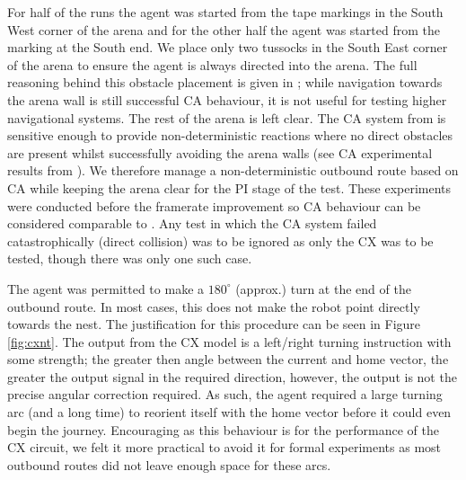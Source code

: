 \documentclass[a4paper,11pt,twoside,openright]{article}
\begin{document}
For half of the runs the agent was started from the tape markings in
the South West corner of the arena and for the other half the agent
was started from the marking at the South end.  We place only two
tussocks in the South East corner of the arena to ensure the agent is
always directed into the arena. The full reasoning behind this
obstacle placement is given in \cite{Mitchell2018}; while navigation
towards the arena wall is still successful CA behaviour, it is not
useful for testing higher navigational systems. The rest of the arena
is left clear. The CA system from \cite{Mitchell2018} is sensitive
enough to provide non-deterministic reactions where no direct
obstacles are present whilst successfully avoiding the arena walls
(see CA experimental results from \cite{Mitchell2018}). We therefore
manage a non-deterministic outbound route based on CA while keeping
the arena clear for the PI stage of the test. These experiments were
conducted before the framerate improvement so CA behaviour can be
considered comparable to \cite{Mitchell2018}. Any test in which the CA
system failed catastrophically (direct collision) was to be ignored as
only the CX was to be tested, though there was only one such case.
\newline\par

The agent was permitted to make a $180^{\circ}$ (approx.) turn at the
end of the outbound route. In most cases, this does not make the robot
point directly towards the nest. The justification for this procedure
can be seen in Figure \ref{fig:cxnt}. The output from the CX model is
a left/right turning instruction with some strength; the greater then
angle between the current and home vector, the greater the output
signal in the required direction, however, the output is not the
precise angular correction required. As such, the agent required a large
turning arc (and a long time) to reorient itself with the home vector
before it could even begin the journey. Encouraging as this behaviour
is for the performance of the CX circuit, we felt it more practical to
avoid it for formal experiments as most outbound routes did not leave
enough space for these arcs.
\newline\par
\end{document}
